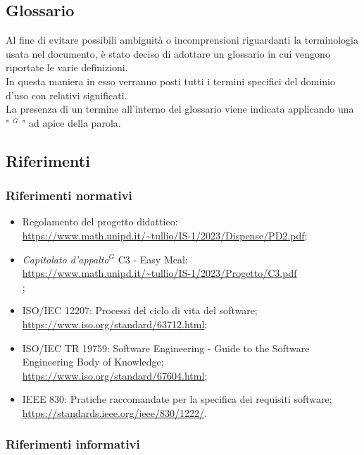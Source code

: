 \subsection{Glossario}
Al fine di evitare possibili ambiguità o incomprensioni riguardanti la terminologia usata nel documento, è stato deciso di adottare un glossario in cui vengono riportate le varie definizioni. \\
In questa maniera in esso verranno posti tutti i termini specifici del dominio d’uso con relativi significati. \\
La presenza di un termine all’interno del glossario viene indicata applicando una " $^{G}$ " ad apice della parola.

\pagebreak
\subsection{Riferimenti}
\subsubsection{Riferimenti normativi}

\begin{itemize}
\item Regolamento del progetto didattico: \\ \url{https://www.math.unipd.it/~tullio/IS-1/2023/Dispense/PD2.pdf};
\item \emph{Capitolato d’appalto}$^{G}$ C3 - Easy Meal: \\ \url{https://www.math.unipd.it/~tullio/IS-1/2023/Progetto/C3.pdf} \\;
\item ISO/IEC 12207: Processi del ciclo di vita del software;\\ \url{https://www.iso.org/standard/63712.html};
\item ISO/IEC TR 19759: Software Engineering - Guide to the Software Engineering Body of Knowledge; \\ \url{https://www.iso.org/standard/67604.html};
\item IEEE 830: Pratiche raccomandate per la specifica dei requisiti software;\\ \url{https://standards.ieee.org/ieee/830/1222/}.
\end{itemize}

        \subsubsection{Riferimenti informativi}

